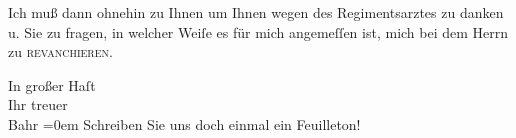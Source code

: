 \pstart
           Ich muß dann ohnehin zu Ihnen um Ihnen wegen des Regimentsarztes zu danken u. Sie zu fragen, in welcher
               Weiſe es für mich angemeſſen ist, mich bei dem Herrn zu \textsc{revan{\pb}chieren}.\pend
           
\pstart
           In großer Haſt{\\[\baselineskip]}Ihr treuer{\\[\baselineskip]}\spacefill\mbox{Bahr}\pend
           \leftskip=0em{}
\pstart
           \noindent{}Schreiben Sie uns doch einmal ein Feuilleton!\pend
           \endnumbering{}  
      